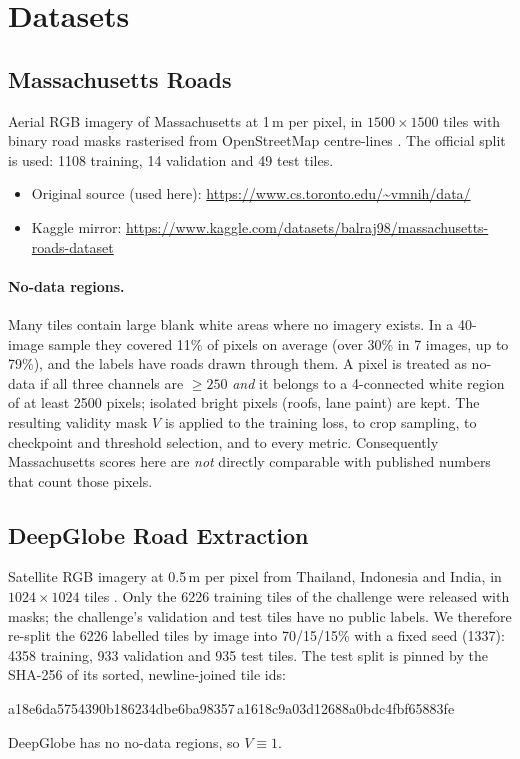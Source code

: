 \documentclass[11pt]{article}
\begin{document}
\section{Datasets}
\label{sec:data}

\subsection{Massachusetts Roads}

Aerial RGB imagery of Massachusetts at 1\,m per pixel, in $1500\times1500$ tiles with binary road
masks rasterised from OpenStreetMap centre-lines \cite{mnih2013}. The official split is used:
1108 training, 14 validation and 49 test tiles.

\begin{itemize}
  \item Original source (used here): \url{https://www.cs.toronto.edu/~vmnih/data/}
  \item Kaggle mirror: \url{https://www.kaggle.com/datasets/balraj98/massachusetts-roads-dataset}
\end{itemize}

\paragraph{No-data regions.} Many tiles contain large blank white areas where no imagery exists.
In a 40-image sample they covered 11\% of pixels on average (over 30\% in 7 images, up to 79\%),
and the labels have roads drawn through them. A pixel is treated as no-data if all three channels
are $\ge 250$ \emph{and} it belongs to a 4-connected white region of at least 2500 pixels; isolated
bright pixels (roofs, lane paint) are kept. The resulting validity mask $V$ is applied to the
training loss, to crop sampling, to checkpoint and threshold selection, and to every metric.
Consequently Massachusetts scores here are \emph{not} directly comparable with published numbers
that count those pixels.

\subsection{DeepGlobe Road Extraction}

Satellite RGB imagery at 0.5\,m per pixel from Thailand, Indonesia and India, in $1024\times1024$
tiles \cite{demir2018}. Only the 6226 training tiles of the challenge were released with masks; the
challenge's validation and test tiles have no public labels. We therefore re-split the 6226
labelled tiles by image into 70/15/15\% with a fixed seed (1337): 4358 training, 933 validation
and 935 test tiles. The test split is pinned by the SHA-256 of its sorted, newline-joined tile ids:
\begin{center}
\footnotesize\ttfamily a18e6da5754390b186234dbe6ba98357\,a1618c9a03d12688a0bdc4fbf65883fe
\end{center}
DeepGlobe has no no-data regions, so $V \equiv 1$.
\end{document}
